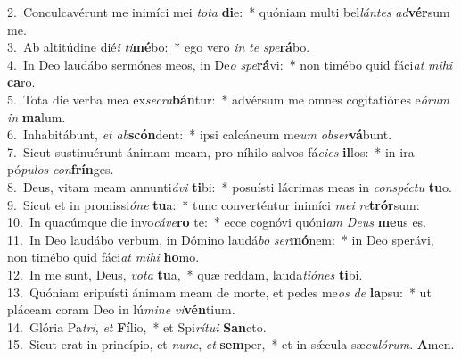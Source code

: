{2.~}Conculcavérunt me inimíci mei \textit{to}\textit{ta} \textbf{di}e:~* quóniam multi bel\textit{lán}\textit{tes} \textit{ad}\textbf{vér}sum me.\\
{3.~}Ab altitúdine dié\textit{i} \textit{ti}\textbf{mé}bo:~* ego vero \textit{in} \textit{te} \textit{spe}\textbf{rá}bo.\\
{4.~}In Deo laudábo sermónes meos, in De\textit{o} \textit{spe}\textbf{rá}vi:~* non timébo quid fáci\textit{at} \textit{mi}\textit{hi} \textbf{ca}ro.\\
{5.~}Tota die verba mea ex\textit{se}\textit{cra}\textbf{bán}tur:~* advérsum me omnes cogitatiónes e\textit{ó}\textit{rum} \textit{in} \textbf{ma}lum.\\
{6.~}Inhabitábunt, \textit{et} \textit{ab}\textbf{scón}dent:~* ipsi calcáneum me\textit{um} \textit{ob}\textit{ser}\textbf{vá}bunt.\\
{7.~}Sicut sustinuérunt ánimam meam, pro níhilo salvos fá\textit{ci}\textit{es} \textbf{il}los:~* in ira pó\textit{pu}\textit{los} \textit{con}\textbf{frín}ges.\\
{8.~}Deus, vitam meam annunti\textit{á}\textit{vi} \textbf{ti}bi:~* posuísti lácrimas meas in \textit{con}\textit{spé}\textit{ctu} \textbf{tu}o.\\
{9.~}Sicut et in promissi\textit{ó}\textit{ne} \textbf{tu}a:~* tunc converténtur inimíci \textit{me}\textit{i} \textit{re}\textbf{trór}sum:\\
{10.~}In quacúmque die invo\textit{cá}\textit{ve}\textbf{ro} te:~* ecce cognóvi quóni\textit{am} \textit{De}\textit{us} \textbf{me}us es.\\
{11.~}In Deo laudábo verbum, in Dómino laudá\textit{bo} \textit{ser}\textbf{mó}nem:~* in Deo sperávi, non timébo quid fáci\textit{at} \textit{mi}\textit{hi} \textbf{ho}mo.\\
{12.~}In me sunt, Deus, \textit{vo}\textit{ta} \textbf{tu}a,~* quæ reddam, lauda\textit{ti}\textit{ó}\textit{nes} \textbf{ti}bi.\\
{13.~}Quóniam eripuísti ánimam meam de morte, et pedes me\textit{os} \textit{de} \textbf{la}psu:~* ut pláceam coram Deo in lú\textit{mi}\textit{ne} \textit{vi}\textbf{vén}tium.\\
{14.~}Glória Pa\textit{tri}, \textit{et} \textbf{Fí}lio,~* et Spi\textit{rí}\textit{tu}\textit{i} \textbf{San}cto.\\
{15.~}Sicut erat in princípio, et \textit{nunc}, \textit{et} \textbf{sem}per,~* et in sǽcula sæ\textit{cu}\textit{ló}\textit{rum}. \textbf{A}men.\\
